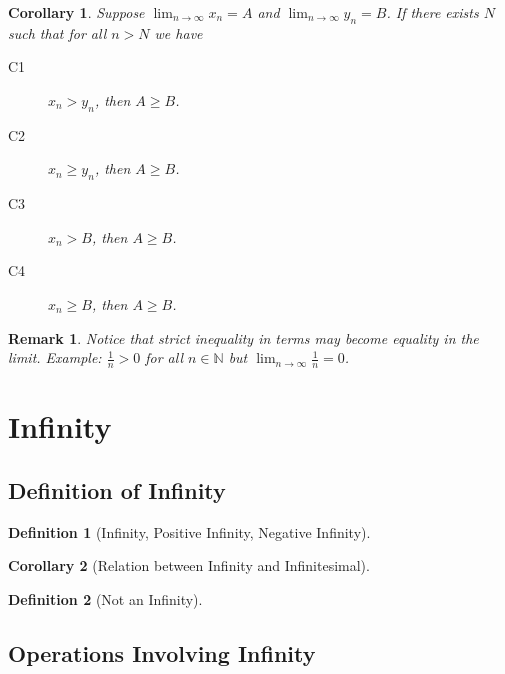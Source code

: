 \documentclass[onecolumn]{ctexart}
\newtheorem{definition}{Definition}
\newtheorem{corollary}{Corollary}
\newtheorem{remark}{Remark}
\begin{document}
\begin{corollary}
  Suppose $\lim_{n \to \infty} x_n = A$ and $\lim_{n \to \infty} y_n = B$. If 
  there exists $N$ such that for all $n > N$ we have
  \begin{description}
    \item[C1] $x_n > y_n$, then $A \geq B$.
    \item[C2] $x_n \geq y_n$, then $A \geq B$.
    \item[C3] $x_n > B$, then $A \geq B$.
    \item[C4] $x_n \geq B$, then $A \geq B$.
  \end{description}
\end{corollary}
\begin{remark}
  Notice that strict inequality in terms may become equality in the limit. 
  Example: $\frac{1}{n} > 0$ for all $n \in \mathbb{N}$ but $\lim_{n \to \infty} 
  \frac{1}{n} = 0$.
\end{remark}

\section{Infinity}

\subsection{Definition of Infinity}

\begin{definition}[Infinity, Positive Infinity, Negative Infinity]
  
\end{definition}

\begin{corollary}[Relation between Infinity and Infinitesimal]
  
\end{corollary}

\begin{definition}[Not an Infinity]
  
\end{definition}

\subsection{Operations Involving Infinity}
\end{document}
